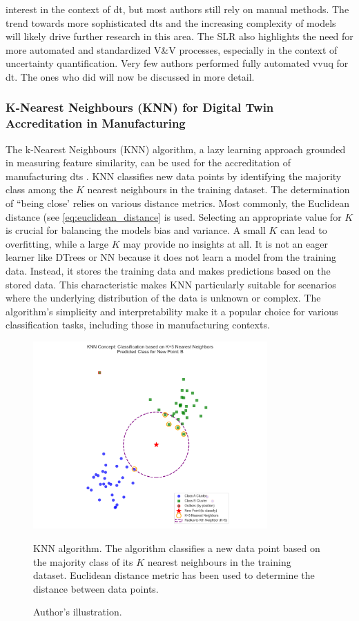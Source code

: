 interest in the context of \gls{dt}, but most authors still rely on manual methods. The trend towards more sophisticated \gls{dt}s and the increasing complexity of models will likely drive further research in this area. The SLR also highlights the need for more automated and standardized V\&V processes, especially in the context of uncertainty quantification. Very few authors performed fully automated \gls{vvuq} for \gls{dt}. The ones who did will now be discussed in more detail.


\subsubsection*{K-Nearest Neighbours (KNN) for Digital Twin Accreditation in Manufacturing}
\label{sec:knn}

The k-Nearest Neighbours (KNN) algorithm, a lazy learning approach grounded in measuring feature similarity, can be used for the accreditation of manufacturing \gls{dt}s \autocite{dos2024simulation}. KNN classifies new data points by identifying the majority class among the $K$ nearest neighbours in the training dataset. The determination of ``being close' relies on various distance metrics. Most commonly, the Euclidean distance (see \autoref{eq:euclidean_distance} is used. Selecting an appropriate value for $K$ is crucial for balancing the models bias and variance. A small $K$ can lead to overfitting, while a large $K$ may provide no insights at all. It is not an eager learner like DTrees or NN because it does not learn a model from the training data. Instead, it stores the training data and makes predictions based on the stored data. This characteristic makes KNN particularly suitable for scenarios where the underlying distribution of the data is unknown or complex. The algorithm's simplicity and interpretability make it a popular choice for various classification tasks, including those in manufacturing contexts.

\begin{figure}[htbp]
  \centering
  \includegraphics[width=0.8\textwidth]{figures/knn.png}
  \caption[KNN Intuition]{KNN algorithm. The algorithm classifies a new data point based on the majority class of its $K$ nearest neighbours in the training dataset. Euclidean distance metric has been used to determine the distance between data points.}
  \label{fig:knn}
  \caption*{Author's illustration.}
\end{figure}

